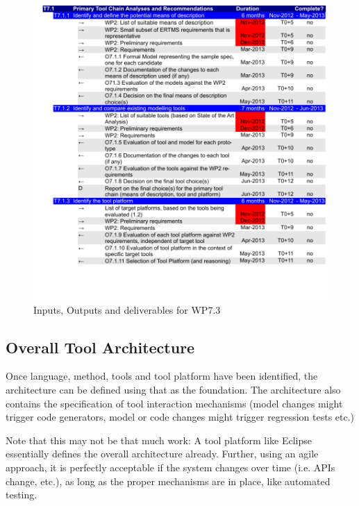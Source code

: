 \documentclass{template/openetcs_article}
\begin{document}
\begin{figure}[!ht]
	\begin{center}
	\includegraphics[width=\textwidth,page=3]{project_plan/WP7_Project_Management.pdf}
	\caption{Inputs, Outputs and deliverables for WP7.3}
	\label{fig:wrspm}
	\end{center}
\end{figure}


\subsection{Overall Tool Architecture}


Once language, method, tools and tool platform have been identified, the architecture can be defined using that as the foundation.  The architecture also contains the specification of tool interaction mechanisms (model changes might trigger code generators, model or code changes might trigger regression tests etc.) 

Note that this may not be that much work:  A tool platform like Eclipse essentially defines the overall architecture already.  Further, using an agile approach, it is perfectly acceptable if the system changes over time (i.e. APIs change, etc.), as long as the proper mechanisms are in place, like automated testing.
\end{document}

